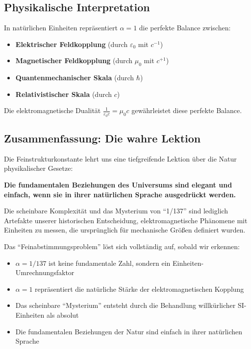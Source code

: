 \documentclass[12pt,a4paper]{article}
\begin{document}
\subsection{Physikalische Interpretation}
\label{subsec:physical_interpretation}

In natürlichen Einheiten repräsentiert $\alpha = 1$ die perfekte Balance zwischen:

\begin{itemize}
	\item \textbf{Elektrischer Feldkopplung} (durch $\varepsilon_0$ mit $c^{-1}$)
	\item \textbf{Magnetischer Feldkopplung} (durch $\mu_0$ mit $c^{+1}$)
	\item \textbf{Quantenmechanischer Skala} (durch $\hbar$)
	\item \textbf{Relativistischer Skala} (durch $c$)
\end{itemize}

Die elektromagnetische Dualität $\frac{1}{\varepsilon_0 c} = \mu_0 c$ gewährleistet diese perfekte Balance.

\subsection{Zusammenfassung: Die wahre Lektion}
\label{subsec:true_lesson}

Die Feinstrukturkonstante lehrt uns eine tiefgreifende Lektion über die Natur physikalischer Gesetze:

\textbf{Die fundamentalen Beziehungen des Universums sind elegant und einfach, wenn sie in ihrer natürlichen Sprache ausgedrückt werden.}

Die scheinbare Komplexität und das Mysterium von ``1/137'' sind lediglich Artefakte unserer historischen Entscheidung, elektromagnetische Phänomene mit Einheiten zu messen, die ursprünglich für mechanische Größen definiert wurden.

Das ``Feinabstimmungsproblem'' löst sich vollständig auf, sobald wir erkennen:

\begin{itemize}
	\item $\alpha = 1/137$ ist keine fundamentale Zahl, sondern ein Einheiten-Umrechnungsfaktor
	\item $\alpha = 1$ repräsentiert die natürliche Stärke der elektromagnetischen Kopplung
	\item Das scheinbare ``Mysterium'' entsteht durch die Behandlung willkürlicher SI-Einheiten als absolut
	\item Die fundamentalen Beziehungen der Natur sind einfach in ihrer natürlichen Sprache
\end{itemize}
\end{document}
